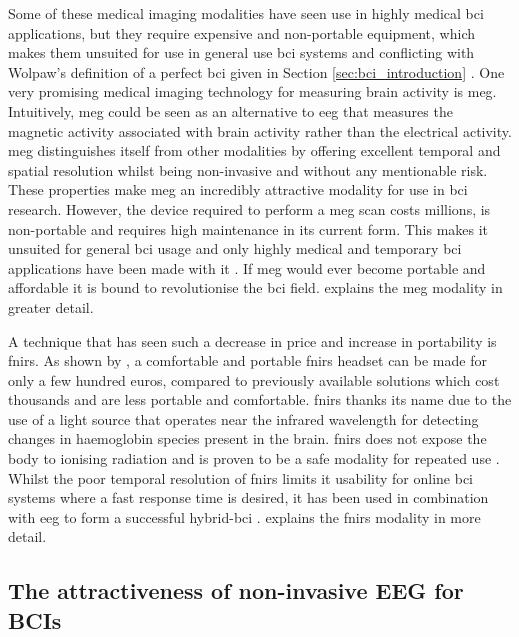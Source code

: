 Some of these medical imaging modalities have seen use in highly medical \gls{bci} applications, but they require expensive and non-portable equipment, which makes them unsuited for use in general use \gls{bci} systems and conflicting with Wolpaw's definition of a perfect \gls{bci} given in Section \ref{sec:bci_introduction} \citep{modalities_review1,modalities_review2}.
One very promising medical imaging technology for measuring brain activity is \gls{meg}.
Intuitively, \gls{meg} could be seen as an alternative to \gls{eeg} that measures the magnetic activity associated with brain activity rather than the electrical activity.
\Gls{meg} distinguishes itself from other modalities by offering excellent temporal and spatial resolution whilst being non-invasive and without any mentionable risk.
These properties make \gls{meg} an incredibly attractive modality for use in \gls{bci} research.
However, the device required to perform a \gls{meg} scan costs millions, is non-portable and requires high maintenance in its current form.
This makes it unsuited for general \gls{bci} usage and only highly medical and temporary \gls{bci} applications have been made with it \citep{modalities_review2}.
If \gls{meg} would ever become portable and affordable it is bound to revolutionise the \gls{bci} field.
 explains the \gls{meg} modality in greater detail.

A technique that has seen such a decrease in price and increase in portability is \gls{fnirs}.
As shown by \citet{fnirs_cheap}, a comfortable and portable \gls{fnirs} headset can be made for only a few hundred euros, compared to previously available solutions which cost thousands and are less portable and comfortable.
\Gls{fnirs} thanks its name due to the use of a light source that operates near the infrared wavelength for detecting changes in haemoglobin species present in the brain.
\Gls{fnirs} does not expose the body to ionising radiation and is proven to be a safe modality for repeated use \citep{fnirs_explained}.
Whilst the poor temporal resolution of \gls{fnirs} limits it usability for online \gls{bci} systems where a fast response time is desired, it has been used in combination with \gls{eeg} to form a successful hybrid-\gls{bci} \citep{modalities_review1, eeg_fnirs_drone}.
 explains the \gls{fnirs} modality in more detail.



\subsection{The attractiveness of non-invasive EEG for BCIs}
\label{subsec:biomedical_signals_measuring_brain_why_eeg}

